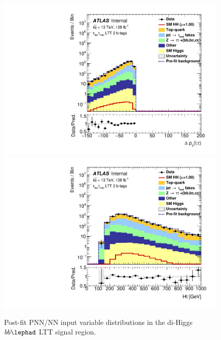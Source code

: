 \begin{figure}
\includegraphics[width=.32\textwidth]{figures/results/HH/LepHad/Region_BMin0_incJet1_distdPtLepTau_J2_D_T2_SpcTauLH_Y2015_LTT1_L1_GlobalFit_conditionnal_mu0log.pdf}
\includegraphics[width=.32\textwidth]{figures/results/HH/LepHad/Region_BMin0_incJet1_distHt_J2_D_T2_SpcTauLH_Y2015_LTT1_L1_GlobalFit_conditionnal_mu0log.pdf}
\caption{Post-fit PNN/NN input variable distributions in the di-Higgs $bb\lephad$ LTT signal region.}
\label{fig:lttmvainputspostfit}
\end{figure}


